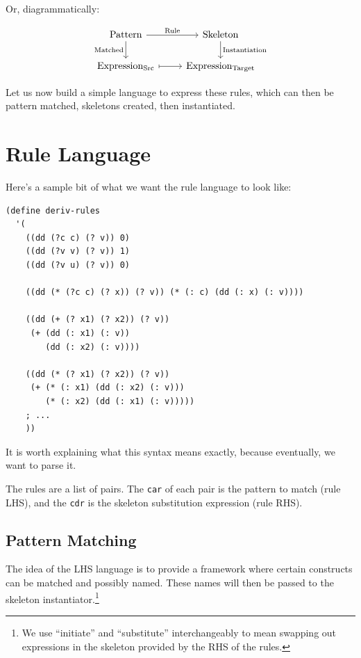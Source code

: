 \documentclass[9pt]{report}
\begin{document}
Or, diagrammatically:

\[\begin{tikzcd} \mathrm{Pattern} \arrow{r}{\mathrm{Rule}}
  \arrow[swap]{d}{\mathrm{Matched}} & \mathrm{Skeleton}
  \arrow{d}{\mathrm{Instantiation}} \\ \mathrm{Expression_{Src}}
  \arrow[mapsto]{r} & \mathrm{Expression_{Target}} \end{tikzcd} \]

Let us now build a simple language to express these rules, which can
then be pattern matched, skeletons created, then instantiated.

\section{Rule Language}
\label{sec:org68c3a0e}

Here's a sample bit of what we want the rule language to look like:

\begin{verbatim}
(define deriv-rules
  '(
    ((dd (?c c) (? v)) 0)
    ((dd (?v v) (? v)) 1)
    ((dd (?v u) (? v)) 0)

    ((dd (* (?c c) (? x)) (? v)) (* (: c) (dd (: x) (: v))))

    ((dd (+ (? x1) (? x2)) (? v))
     (+ (dd (: x1) (: v))
        (dd (: x2) (: v))))

    ((dd (* (? x1) (? x2)) (? v))
     (+ (* (: x1) (dd (: x2) (: v)))
        (* (: x2) (dd (: x1) (: v)))))
    ; ...
    ))
\end{verbatim}

It is worth explaining what this syntax means exactly, because
eventually, we want to parse it.

The rules are a list of pairs. The \texttt{car} of each pair is the
pattern to match (rule LHS), and the \texttt{cdr} is the skeleton
substitution expression (rule RHS).

\subsection{Pattern Matching}
\label{sec:orgb4f93e9}

The idea of the LHS language is to provide a framework where
certain constructs can be matched and possibly named. These names
will then be passed to the skeleton instantiator.\footnote{We use ``initiate'' and ``substitute'' interchangeably to mean
swapping out expressions in the skeleton provided by the RHS of the
rules.}
\end{document}
